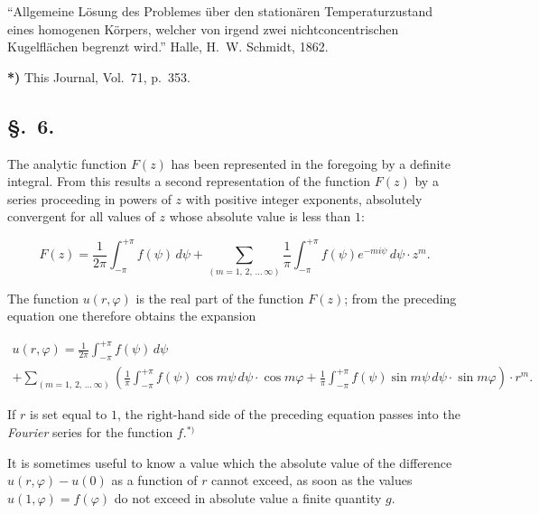 \documentclass{article}
\begin{document}
``Allgemeine Lösung des Problemes über den stationären Temperaturzustand eines homogenen Körpers, welcher von irgend zwei nichtconcentrischen Kugelflächen begrenzt wird.'' Halle, H.~W. Schmidt, 1862.



\textbf{*)} This Journal, Vol.~71, p.~353.




\subsection*{§.~6.}



The analytic function $F(z)$ has been represented in the foregoing by a definite integral. From this results a second representation of the function $F(z)$ by a series proceeding in powers of $z$ with positive integer exponents, absolutely convergent for all values of $z$ whose absolute value is less than $1$:

\[

F(z) = \frac{1}{2\pi} \int_{-\pi}^{+\pi} f(\psi)\,d\psi + \sum_{(m=1, \, 2, \, \dots \, \infty)} \frac{1}{\pi} \int_{-\pi}^{+\pi} f(\psi) e^{-mi\psi}\,d\psi \cdot z^m.

\]



The function $u(r, \varphi)$ is the real part of the function $F(z)$; from the preceding equation one therefore obtains the expansion

\[

\begin{gathered}

u(r, \varphi) = \frac{1}{2\pi} \int_{-\pi}^{+\pi} f(\psi)\,d\psi \\

+ \sum_{(m=1, \, 2, \, \dots \, \infty)} \left( \frac{1}{\pi} \int_{-\pi}^{+\pi} f(\psi) \cos m\psi\,d\psi \cdot \cos m\varphi + \frac{1}{\pi} \int_{-\pi}^{+\pi} f(\psi) \sin m\psi\,d\psi \cdot \sin m\varphi \right) \cdot r^m.

\end{gathered}

\]

If $r$ is set equal to $1$, the right-hand side of the preceding equation passes into the \emph{Fourier} series for the function $f$.${}^{*)}$



It is sometimes useful to know a value which the absolute value of the difference $u(r, \varphi) - u(0)$ as a function of $r$ cannot exceed, as soon as the values $u(1, \varphi) = f(\varphi)$ do not exceed in absolute value a finite quantity $g$.
\end{document}
